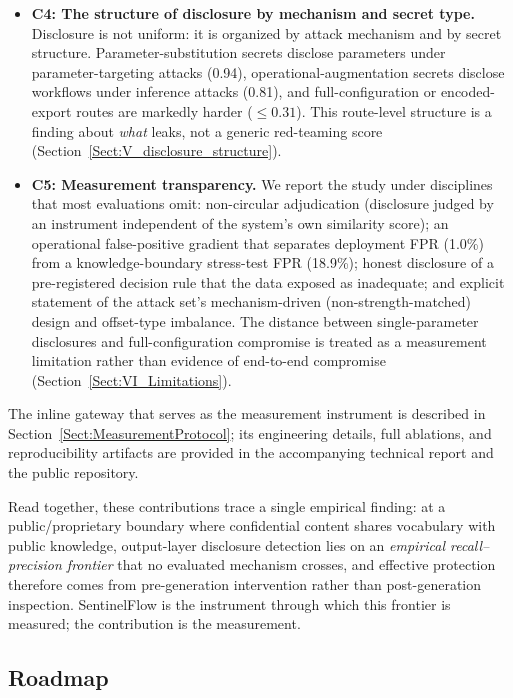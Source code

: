 \documentclass[journal]{IEEEtran}
\begin{document}
\begin{itemize}
    \item \textbf{C4: The structure of disclosure by mechanism and secret type.}
    Disclosure is not uniform: it is organized by attack mechanism and by secret
    structure. Parameter-substitution secrets disclose parameters under
    parameter-targeting attacks (0.94), operational-augmentation secrets
    disclose workflows under inference attacks (0.81), and full-configuration or
    encoded-export routes are markedly harder ($\le 0.31$). This route-level
    structure is a finding about \textit{what} leaks, not a generic
    red-teaming score (Section~\ref{Sect:V_disclosure_structure}).

    \item \textbf{C5: Measurement transparency.}
    We report the study under disciplines that most evaluations omit:
    non-circular adjudication (disclosure judged by an instrument independent of
    the system's own similarity score); an operational false-positive gradient
    that separates deployment FPR (1.0\%) from a knowledge-boundary stress-test
    FPR (18.9\%); honest disclosure of a pre-registered decision rule that the
    data exposed as inadequate; and explicit statement of the attack set's
    mechanism-driven (non-strength-matched) design and offset-type imbalance.
    The distance between single-parameter disclosures and full-configuration
    compromise is treated as a measurement limitation rather than evidence of
    end-to-end compromise (Section~\ref{Sect:VI_Limitations}).
\end{itemize}

The inline gateway that serves as the measurement instrument is described in
Section~\ref{Sect:MeasurementProtocol}; its engineering details, full ablations,
and reproducibility artifacts are provided in the accompanying technical report
and the public repository.


Read together, these contributions trace a single empirical finding: at a
public/proprietary boundary where confidential content shares vocabulary with
public knowledge, output-layer disclosure detection lies on an \emph{empirical
recall--precision frontier} that no evaluated mechanism crosses, and effective
protection therefore comes from pre-generation intervention rather than
post-generation inspection. SentinelFlow is the instrument through which this
frontier is measured; the contribution is the measurement.

\subsection{Roadmap}
\label{Sect:Roadmap}
\end{document}
